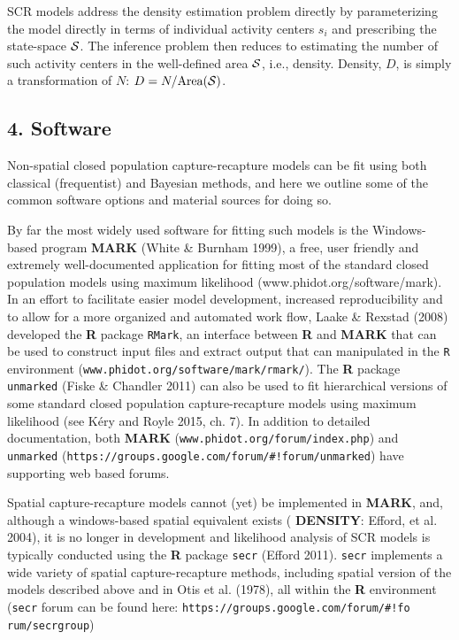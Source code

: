 \documentclass{book}
\begin{document}
SCR models address the density estimation problem directly by
parameterizing the model directly in terms of individual activity
centers $s_i$ and prescribing the state-space ${\cal S}$. The
inference problem then reduces to estimating the number of such
activity centers in the well-defined area ${\cal S}$, i.e., density.
Density, $D$, is simply a transformation of $N$: $D =
N/\mbox{Area}({\cal S})$.

\subsection*{4. Software}

Non-spatial closed population capture-recapture models can be fit
using both classical (frequentist) and Bayesian methods, and here we
outline some of the common software options and material sources for
doing so.

By far the most widely used software for fitting such models is the
Windows-based program {\bf MARK} (White \& Burnham 1999), a free, user
friendly and extremely well-documented application for fitting most of
the standard closed population models using maximum likelihood
(www.phidot.org/software/mark). In an effort to facilitate easier
model development, increased reproducibility and to allow for a more
organized and automated work flow, Laake \& Rexstad (2008) developed
the {\bf R} package {\tt RMark}, an interface between {\bf R} and {\bf
  MARK} that can be used to construct input files and extract output
that can manipulated in the {\tt R} environment
(\verb|www.phidot.org/software/mark/rmark/|). The {\bf R} package {\tt
  unmarked} (Fiske \& Chandler 2011)
can also be used to fit hierarchical versions of some
standard closed population capture-recapture models using maximum
likelihood (see K\'{e}ry and Royle 2015, ch. 7).
In addition to detailed
documentation, both {\bf MARK} (\verb|www.phidot.org/forum/index.php|) and
{\tt unmarked}
(\verb|https://groups.google.com/forum/#!forum/unmarked|) have
supporting web based forums.

Spatial capture-recapture models cannot (yet) be implemented in {\bf
  MARK}, and, although a windows-based spatial equivalent exists ({\bf
  DENSITY}: Efford, et al. 2004), it is no longer in development and
likelihood analysis of SCR models is typically conducted using the
{\bf R} package {\tt secr} (Efford 2011). {\tt secr} implements a wide
variety of spatial capture-recapture methods, including spatial
version of the models described above and in Otis et al. (1978), all
within the {\bf R} environment ({\tt secr} forum can be found here:
\verb|https://groups.google.com/forum/#!fo| \verb|rum/secrgroup|)
\end{document}
